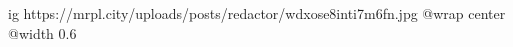  
 
 
 
 

\ifcmt
  ig https://mrpl.city/uploads/posts/redactor/wdxose8inti7m6fn.jpg
  @wrap center
  @width 0.6
\fi

